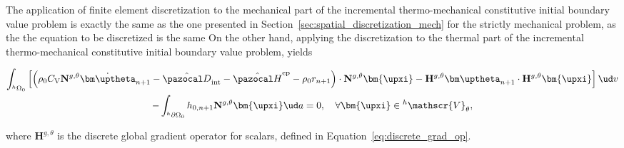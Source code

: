 The application of finite element discretization to the mechanical part of the incremental thermo-mechanical constitutive initial boundary value problem is exactly the same as the one presented in Section~\ref{sec:spatial_discretization_mech} for the strictly mechanical problem, as the the equation to be discretized is the same
On the other hand, applying the discretization to the thermal part of the incremental thermo-mechanical constitutive initial boundary value problem, yields
\begin{highlight}[innertopmargin=-5pt]
    \begin{multline}
    \int_{^h\Omega_0}   \left[\left(\rho_0C_\mathrm{V}\mathbf N^{g,\theta} \dot{\bm\uptheta}_{n+1} -\hat{\pazocal D}_\text{int} - \hat{\pazocal H}^\text{ep}- \rho_0 r_{n+1} \right) \cdot \mathbf N^{g,\theta}\bm{\upxi} - \mathbf H^{g,\theta} {\bm\uptheta}_{n+1} \cdot \mathbf H^{g,\theta} \bm{\upxi}\right]\ud v \\- \int_{^h\partial\Omega_0} h_{0,n+1} \mathbf N^{g,\theta}\bm{\upxi}\ud a = 0,\quad \forall \bm{\upxi} \in {}^h\mathscr{V}_{\theta}, \label{eq:thermo_mech_thermo_fem_disc}
    \end{multline}
\end{highlight}
where $\mathbf H^{g,\theta}$ is the discrete global gradient operator for scalars, defined in Equation~\eqref{eq:discrete_grad_op}.

